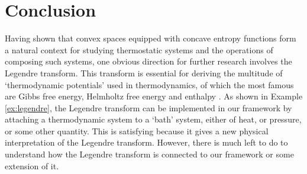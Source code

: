 \documentclass[12pt, reqno]{amsart}
\begin{document}
\section{Conclusion}

Having shown that convex spaces equipped with concave entropy functions form a natural context for studying thermostatic systems and the operations of composing such systems, one obvious direction for further research involves the Legendre transform. This transform is essential for deriving the multitude of `thermodynamic potentials' used in thermodynamics, of which the most famous are Gibbs free energy, Helmholtz free energy and enthalpy \cite{GaglianiScotti, PointErlicher, Willerton}. As shown in Example \ref{ex:legendre}, the Legendre transform can be implemented in our framework by attaching a thermodynamic system to a `bath' system, either of heat, or pressure, or some other quantity. This is satisfying because it gives a new physical interpretation of the Legendre transform.  However, there is much left to do to understand how the Legendre transform is connected to our framework or some extension of it.

\printbibliography
\end{document}
